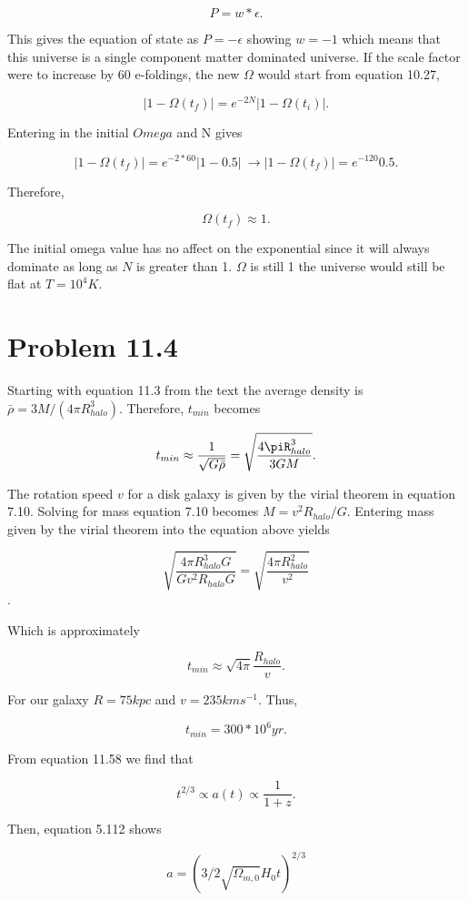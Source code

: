 \documentclass[12pt]{article}
\begin{document}
$$
P = w*\epsilon.
$$

This gives the equation of state as $P = -\epsilon$ showing $w = -1$ which means that this universe is a single component matter dominated universe. If the scale factor were to increase by 60 e-foldings, the new $\Omega$ would start from equation 10.27,

$$
|1 - \Omega(t_{f})| = e^{-2N}|1 - \Omega(t_{i})|.
$$

Entering in the initial $Omega$ and N gives

$$
|1 - \Omega(t_{f})| = e^{-2*60}|1 - 0.5| \ \rightarrow |1 - \Omega(t_{f})| = e^{-120} 0.5.
$$

Therefore,

$$
\Omega(t_f) \approx 1.
$$

The initial omega value has no affect on the exponential since it will always dominate as long as $N$ is greater than 1. $\Omega$ is still 1 the universe would still be flat at $T = 10^{4} K$.



\section*{Problem 11.4}

Starting with equation 11.3 from the text the average density is $\bar{\rho} = 3M/(4\pi R_{halo}^{3})$. Therefore, $t_{min}$ becomes

$$
t_{min} \approx \frac{1}{\sqrt{G\bar{\rho}}} = \sqrt{\frac{4\piR_{halo}^{3}}{3GM}}.
$$

The rotation speed $v$ for a disk galaxy is given by the virial theorem in equation 7.10. Solving for mass equation 7.10 becomes $M = v^{2}R_{halo}/G$. Entering mass given by the virial theorem into the equation above yields 

$$
\sqrt{\frac{4\pi R_{halo}^{3}G}{Gv^{2}R_{halo}G}} = \sqrt{\frac{4\pi R_{halo}^{2}}{v^{2}}}
$$.

Which is approximately 

$$
t_{min} \approx \sqrt{4\pi}\frac{R_{halo}}{v}.
$$

For our galaxy $R = 75 kpc$ and $v = 235 km s^{-1}$. Thus,

$$
t_{min} = 300*10^{6} yr.
$$

From equation 11.58 we find that

$$
t^{2/3} \propto a(t) \propto \frac{1}{1 + z}.
$$

Then, equation 5.112 shows 

$$
a = (3/2\sqrt{\Omega_{m,0}}H_{0}t)^{2/3}
$$
\end{document}
